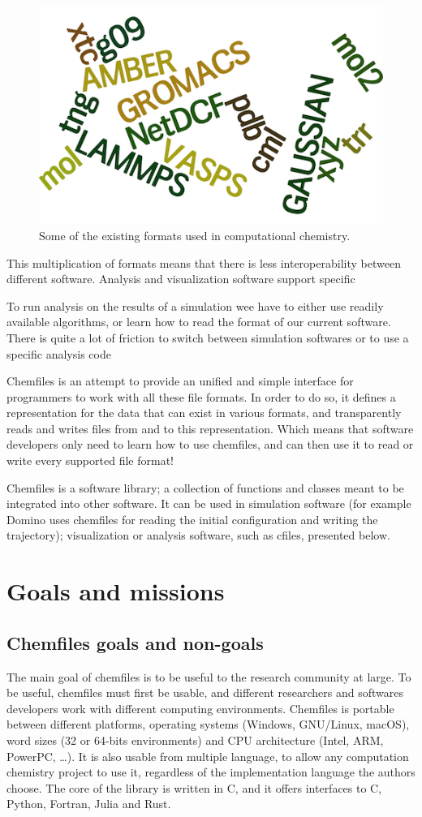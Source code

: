 \documentclass[thesis]{subfiles}
\def\cxx{{C\nolinebreak[4]\hspace{-.05em}\raisebox{.3ex}{\footnotesize ++}}\xspace}
\begin{document}
\begin{figure}[ht]
    \centering
    \includegraphics[width=.4\textwidth]{figures/images/files-formats}
    \caption{Some of the existing formats used in computational chemistry.}
    \label{fig:chemfiles:formats}
\end{figure}

This multiplication of formats means that there is less interoperability between
different software. Analysis and visualization software support specific

To run analysis on the results of a simulation wee have to
either use readily available algorithms, or learn how to read the format of our
current software. There is quite a lot of friction to switch between simulation
softwares or to use a specific analysis code

Chemfiles is an attempt to provide an unified and simple interface for
programmers to work with all these file formats. In order to do so, it defines a
representation for the data that can exist in various formats, and transparently
reads and writes files from and to this representation.  Which means that
software developers only need to learn how to use chemfiles, and can then use it
to read or write every supported file format!

Chemfiles is a software library; a collection of functions and classes meant to
be integrated into other software. It can be used in simulation software (for
example Domino uses chemfiles for reading the initial configuration and writing
the trajectory); visualization or analysis software, such as cfiles, presented
below.

\section{Goals and missions}

\subsection{Chemfiles goals and non-goals}

The main goal of chemfiles is to be useful to the research community at large.
To be useful, chemfiles must first be usable, and different researchers and
softwares developers work with different computing environments. Chemfiles  is
portable between different platforms, operating systems (Windows, GNU/Linux,
macOS), word sizes (32 or 64-bits environments) and CPU architecture (Intel,
ARM, PowerPC, \dots). It is also usable from multiple language, to allow any
computation chemistry project to use it, regardless of the implementation
language the authors choose. The core of the library is written in \cxx, and it
offers interfaces to C, Python, Fortran, Julia and Rust.
\end{document}
